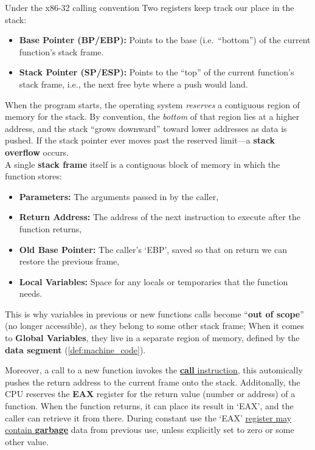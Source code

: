 \begin{Def}

Under the x86-32 calling convention Two registers keep track our place in the stack:
\begin{itemize}
  \item \textbf{Base Pointer (BP/EBP):} Points to the base (i.e.\ ``bottom'') of the current function's stack frame.
  \item \textbf{Stack Pointer (SP/ESP):} Points to the ``top'' of the current function's stack frame, i.e., the next free byte where a push would land.
\end{itemize}

\noindent
When the program starts, the operating system \emph{reserves} a contiguous region of memory for the stack. By convention, the \emph{bottom} of that region lies at a higher address, 
and the stack ``grows downward'' toward lower addresses as data is pushed. If the stack pointer ever moves past the reserved limit---a \textbf{stack overflow} occurs.
\\

\noindent
A single \textbf{stack frame} itself is a contiguous block of memory in which the function stores:
\begin{itemize}
  \item \textbf{Parameters:} The arguments passed in by the caller,  
  \item \textbf{Return Address:} The address of the next instruction to execute after the function returns,
  \item \textbf{Old Base Pointer:} The caller's `EBP', saved so that on return we can restore the previous frame,
  \item \textbf{Local Variables:} Space for any locals or temporaries that the function needs.  
\end{itemize}

\noindent
This is why variables in previous or new functions calls become ``\textbf{out of scope}'' (no longer accessible), as they belong to some other stack frame; 
When it comes to \textbf{Global Variables}, they live in a separate region of memory, defined by the \textbf{data segment} (\ref{def:machine_code}).

Moreover, a call to a new function invokes the \underline{\textbf{call} instruction}, this automically pushes the return address to the current frame onto the stack.
Additonally, the CPU reserves the \textbf{EAX} register for the return value (number or address) of a function. 
When the function returns, it can place its result in `EAX', and the caller can retrieve it from there. During constant use 
the `EAX' \underline{register may contain \textbf{garbage}} data from previous use, unless explicitly set to zero or some other value.
\end{Def}

